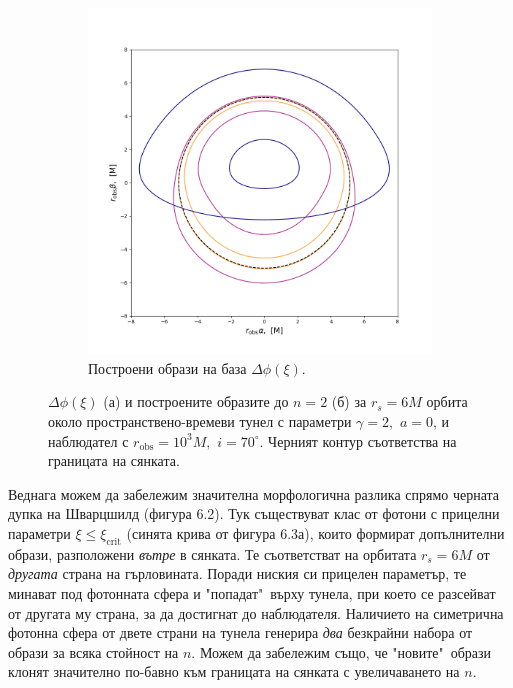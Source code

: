 \begin{figure}[h]
\begin{subfigure}{6cm}
		\includegraphics[scale = 0.3]{WH_70_deg_r6_gamma_2.png}
		\caption{Построени образи на база $\Delta\phi(\xi)$.\newline} \label{fig:1b}
	\end{subfigure}
	\caption[$\Delta\phi(\xi)$ и образите за $r_s=6M$ орбита около пространствено-времеви тунел до $n = 2$.]{\small $\Delta\phi(\xi)$ (а) и построените образите до $n = 2$ (б) за $r_s=6M$ орбита около пространствено-времеви тунел с параметри $\gamma = 2,\,\, a = 0$, и наблюдател с $r_\text{obs} = 10^3M,\,\,i = 70^\circ$. Черният контур съответства на границата на сянката.} 
	\label{WH_r6_orbit}
\end{figure}

\lfoot{}
Веднага можем да забележим значителна морфологична разлика спрямо черната дупка на Шварцшилд (фигура 6.2). Тук съществуват клас от фотони с прицелни параметри $\xi \le \xi_\text{crit}$ (синята крива от фигура 6.3а), които формират допълнителни образи, разположени \emph{вътре} в сянката. Те съответстват на орбитата $r_s = 6M$ от \emph{другата} страна на гърловината. Поради ниския си прицелен параметър, те минават под фотонната сфера и "попадат"$\,$ върху тунела, при което се разсейват от другата му страна, за да достигнат до наблюдателя. Наличието на симетрична фотонна сфера от двете страни на тунела генерира \emph{два} безкрайни набора от образи за всяка стойност на $n$. Можем да забележим също, че "новите"$\,$ образи клонят значително по-бавно към границата на сянката с увеличаването на $n$.\\

